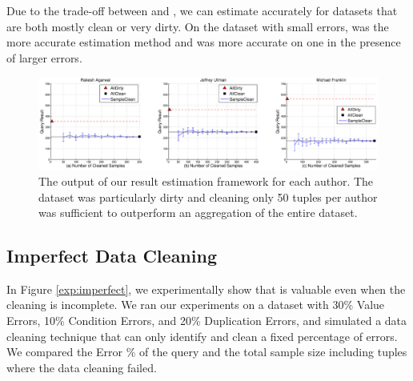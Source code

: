 Due to the trade-off between \bias and \sampleclean, we can estimate accurately for datasets that are both mostly clean or very dirty.
On the dataset with small errors, \bias was the more accurate estimation method and \sampleclean was more accurate on one in the presence of larger errors.


\begin{figure}[t]\vspace{-2.5em}
\hspace*{-2em}
\includegraphics[scale=0.35]{exp/msacademic-paper-count.eps}\vspace{-1em}
\caption{The output of our result estimation framework for each author. The dataset was particularly dirty and cleaning only 50 tuples per author was sufficient to outperform an aggregation of the entire dataset.}
\label{exp:ms-academic-paper-count}
\end{figure}

\subsection{Imperfect Data Cleaning}
\label{exp:sensitivity}

In Figure \ref{exp:imperfect}, we experimentally show that \saqpplus is valuable even when the cleaning is incomplete.
We ran our experiments on a dataset with 30\% Value Errors, 10\% Condition Errors, and 20\% Duplication Errors, and simulated
a data cleaning technique that can only identify and clean a fixed percentage of errors.
We compared the Error \% of the query and the total sample size including tuples where the data cleaning failed.

